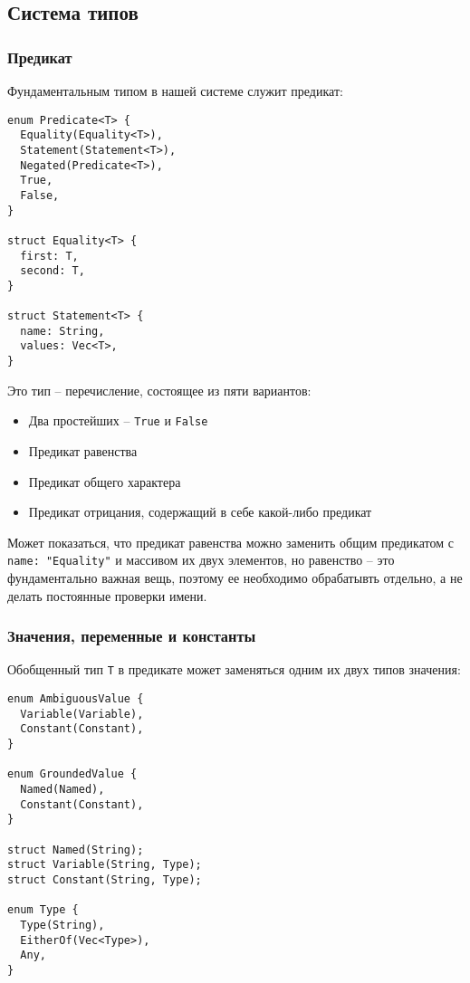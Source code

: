 \documentclass{article}
\begin{document}
\subsection{Система типов}

\subsubsection{Предикат}

Фундаментальным типом в нашей системе служит предикат:

\begin{verbatim}
enum Predicate<T> {
  Equality(Equality<T>),
  Statement(Statement<T>),
  Negated(Predicate<T>),
  True,
  False,
}

struct Equality<T> {
  first: T,
  second: T,
}

struct Statement<T> {
  name: String,
  values: Vec<T>,
}
\end{verbatim}

Это тип -- перечисление, состоящее из пяти вариантов:
\begin{itemize}
  \item Два простейших -- \texttt{True} и \texttt{False}
  \item Предикат равенства
  \item Предикат общего характера
  \item Предикат отрицания, содержащий в себе какой-либо предикат
\end{itemize}

Может показаться, что предикат равенства можно заменить общим предикатом
с \texttt{name: "Equality"} и массивом их двух элементов,
но равенство -- это фундаментально важная вещь, поэтому ее необходимо обрабатывть отдельно,
а не делать постоянные проверки имени.

\subsubsection{Значения, переменные и константы}

Обобщенный тип \texttt{T} в предикате может заменяться одним их двух типов значения:

\begin{verbatim}
enum AmbiguousValue {
  Variable(Variable),
  Constant(Constant),
}

enum GroundedValue {
  Named(Named),
  Constant(Constant),
}

struct Named(String);
struct Variable(String, Type);
struct Constant(String, Type);

enum Type {
  Type(String),
  EitherOf(Vec<Type>),
  Any,
}
\end{verbatim}
\end{document}
